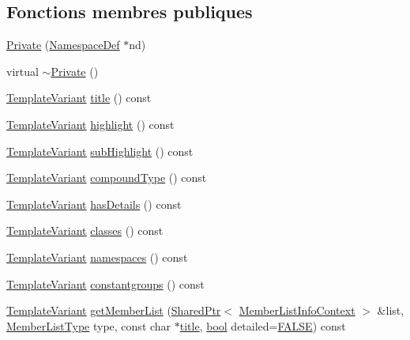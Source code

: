 \subsection*{Fonctions membres publiques}
\begin{DoxyCompactItemize}
\item 
\hyperlink{class_namespace_context_1_1_private_aa64cf5aa04de90e98e78c5afaf410574}{Private} (\hyperlink{class_namespace_def}{Namespace\+Def} $\ast$nd)
\item 
virtual \hyperlink{class_namespace_context_1_1_private_a9d2f8e4839bfd9004f5b74f5fbc4010f}{$\sim$\+Private} ()
\item 
\hyperlink{class_template_variant}{Template\+Variant} \hyperlink{class_namespace_context_1_1_private_a2bcc020541410bcff33fb6d831bea1ae}{title} () const 
\item 
\hyperlink{class_template_variant}{Template\+Variant} \hyperlink{class_namespace_context_1_1_private_a8a69f174b18e32f2017dd890a06a06aa}{highlight} () const 
\item 
\hyperlink{class_template_variant}{Template\+Variant} \hyperlink{class_namespace_context_1_1_private_a80471188982f0fa7c05669a8d8a457a9}{sub\+Highlight} () const 
\item 
\hyperlink{class_template_variant}{Template\+Variant} \hyperlink{class_namespace_context_1_1_private_a4fb825506ebb6f17c9a504743661bdb2}{compound\+Type} () const 
\item 
\hyperlink{class_template_variant}{Template\+Variant} \hyperlink{class_namespace_context_1_1_private_a321d5540fab23d495e274a5c6e3d8af1}{has\+Details} () const 
\item 
\hyperlink{class_template_variant}{Template\+Variant} \hyperlink{class_namespace_context_1_1_private_aa69bed7e7ac2faed26debc26356df3fe}{classes} () const 
\item 
\hyperlink{class_template_variant}{Template\+Variant} \hyperlink{class_namespace_context_1_1_private_aedf3bdc3662c53aae6bb6886815d909e}{namespaces} () const 
\item 
\hyperlink{class_template_variant}{Template\+Variant} \hyperlink{class_namespace_context_1_1_private_a687c7efbc62c8130897f8fac005e9d4e}{constantgroups} () const 
\item 
\hyperlink{class_template_variant}{Template\+Variant} \hyperlink{class_namespace_context_1_1_private_abeea485c6b65263e98a2409a5ce841bc}{get\+Member\+List} (\hyperlink{class_shared_ptr}{Shared\+Ptr}$<$ \hyperlink{class_member_list_info_context}{Member\+List\+Info\+Context} $>$ \&list, \hyperlink{types_8h_abe8ad5992f8938a28f918f51b199aa19}{Member\+List\+Type} type, const char $\ast$\hyperlink{class_namespace_context_1_1_private_a2bcc020541410bcff33fb6d831bea1ae}{title}, \hyperlink{qglobal_8h_a1062901a7428fdd9c7f180f5e01ea056}{bool} detailed=\hyperlink{qglobal_8h_a10e004b6916e78ff4ea8379be80b80cc}{F\+A\+L\+S\+E}) const 

\end{DoxyCompactItemize}
